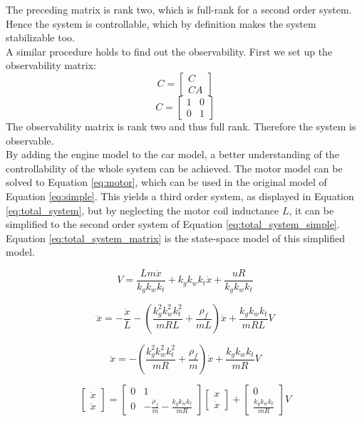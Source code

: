 \documentclass[final]{scrreprt} %
\begin{document}
The preceding matrix is rank two, which is full-rank for a second order system.
Hence the system is controllable, which by definition makes the system stabilizable too.
\\
A similar procedure holds to find out the observability.
First we set up the observability matrix:
\begin{equation}
C =
\begin{bmatrix}
C\\
CA
\end{bmatrix}
\end{equation}
\begin{equation}
C =
\begin{bmatrix}
1 & 0\\
0 & 1
\end{bmatrix}\label{eq:observability}
\end{equation}
The observability matrix is rank two and thus full rank.
Therefore the system is observable.
\\
By adding the engine model to the car model, a better understanding of the controllability of the whole system can be achieved.
The motor model can be solved to Equation \ref{eq:motor}, which can be used in the original model of Equation \ref{eq:simple}.
This yields a third order system, as displayed in Equation \ref{eq:total_system}, but by neglecting the motor coil inductance $L$, it can be simplified to the second order system of Equation \ref{eq:total_system_simple}.
Equation \ref{eq:total_system_matrix} is the state-space model of this simplified model.

\begin{equation}
	V = \frac{Lm\ddot{x}}{k_g k_w k_t} + k_g k_w k_t \dot{x} + \frac{uR}{k_g k_w k_t}
	\label{eq:motor}
\end{equation}

\begin{equation}
	\dddot{x} = -\frac{\ddot{x}}{L} -(\frac{k_g^2 k_w^2 k_t^2}{mRL} + \frac{\rho_f}{mL})\dot{x} + \frac{k_g k_w k_t}{mRL}V
	\label{eq:total_system}
\end{equation}

\begin{equation}
	\ddot{x} = -(\frac{k_g^2 k_w^2 k_t^2}{mR} + \frac{\rho_f}{m})\dot{x} + \frac{k_g k_w k_t}{mR}V
	\label{eq:total_system_simple}
\end{equation}

\begin{equation}
	\begin{bmatrix}
		\dot{x} \\
		\ddot{x}
	\end{bmatrix} =
	\begin{bmatrix}
		0 & 1 \\
		0 & -\frac{\rho_f}{m} - \frac{k_g k_w k_t}{mR}
	\end{bmatrix}
	\begin{bmatrix}
		x \\
		\dot{x}
	\end{bmatrix} +
	\begin{bmatrix}
		0 \\
		\frac{k_g k_w k_t}{mR}
	\end{bmatrix}
	V
	\label{eq:total_system_matrix}
\end{equation}
\end{document}
